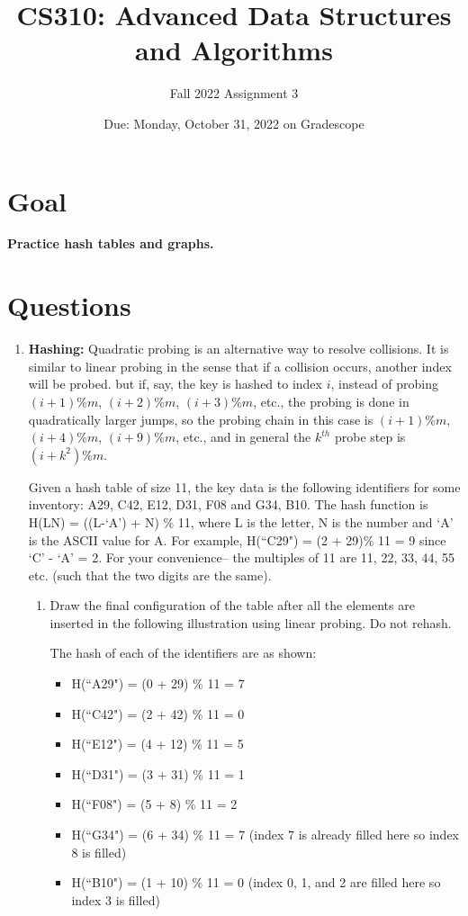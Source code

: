 \documentclass[letterpaper, 11pt]{article}
\title{CS310: Advanced Data Structures and Algorithms}
\author{Fall 2022 Assignment 3}
\date{Due: Monday, October 31, 2022 on Gradescope}
\begin{document}
\maketitle

\section*{Goal}

\textbf{Practice hash tables and graphs.}

\section*{Questions}

\begin{enumerate}
    \item \textbf{Hashing:} Quadratic probing is an alternative way to resolve collisions. It is similar to linear probing in the sense that if a collision occurs, another index will be probed. but if, say, the key is hashed to index $i$, instead of probing $(i+1)\%m$, $(i+2)\%m$, $(i+3)\%m$, etc., the probing is done in quadratically larger jumps, so the probing chain in this case is $(i+1)\%m$, $(i+4)\%m$, $(i+9)\%m$, etc., and in general the $k^{th}$ probe step is $(i+k^2)\%m$.

    Given a hash table of size 11, the key data is the following identifiers for some inventory: A29, C42, E12, D31, F08 and G34, B10. The hash function is H(LN) = ((L-`A’) + N) \% 11, where L is the letter, N is the number and `A' is the ASCII value for A. For example, H(``C29") = (2 + 29)\% 11 = 9 since `C' - `A' = 2. For your convenience– the multiples of 11 are 11, 22, 33, 44, 55 etc. (such that the two digits are the same).

    \begin{enumerate}
        \item Draw the final configuration of the table after all the elements are inserted in the following illustration using linear probing. Do not rehash.

        The hash of each of the identifiers are as shown:
        \begin{itemize}
            \item H(``A29") = (0 + 29) \% 11 = 7
            \item H(``C42") = (2 + 42) \% 11 = 0
            \item H(``E12") = (4 + 12) \% 11 = 5
            \item H(``D31") = (3 + 31) \% 11 = 1
            \item H(``F08") = (5 + 8) \% 11 = 2
            \item H(``G34") = (6 + 34) \% 11 = 7 (index 7 is already filled here so index 8 is filled)
            \item H(``B10") = (1 + 10) \% 11 = 0 (index 0, 1, and 2 are filled here so index 3 is filled)
        \end{itemize}


\end{enumerate}
\end{enumerate}
\end{document}
